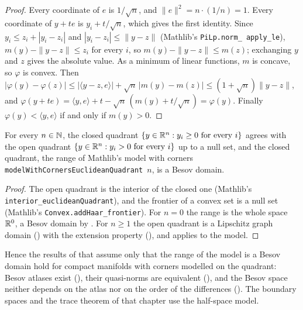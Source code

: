 \begin{proof}
\leanok
Every coordinate of $e$ is $1/\sqrt{n}$, and $\|e\|^2 = n \cdot (1/n) = 1$. Every coordinate of
$y + te$ is $y_i + t/\sqrt{n}$, which gives the first identity. Since $y_i \leq z_i + |y_i - z_i|$
and $|y_i - z_i| \leq \|y - z\|$ (Mathlib's \texttt{PiLp.\allowbreak norm\_\allowbreak
apply\_\allowbreak le}), $m(y) - \|y - z\| \leq z_i$ for every $i$, so $m(y) - \|y - z\| \leq
m(z)$; exchanging $y$ and $z$ gives the absolute value. As a minimum of linear functions, $m$ is
concave, so $\varphi$ is convex. Then
$|\varphi(y) - \varphi(z)| \leq |\langle y - z, e \rangle| + \sqrt{n}\, |m(y) - m(z)| \leq
(1 + \sqrt{n}) \|y - z\|$, and $\varphi(y + te) = \langle y, e \rangle + t - \sqrt{n}\,(m(y) +
t/\sqrt{n}) = \varphi(y)$. Finally $\varphi(y) < \langle y, e \rangle$ if and only if $m(y) > 0$.
\end{proof}

\begin{theorem}
\label{thm:quadrant-besov-domain}
\leanok
{}
For every $n \in \mathbb{N}$, the closed quadrant $\{y \in \mathbb{R}^n : y_i \geq 0 \text{ for every } i\}$
agrees with the open quadrant $\{y \in \mathbb{R}^n : y_i > 0 \text{ for every } i\}$ up to a null set,
and the closed quadrant, the range of Mathlib's model with corners
\texttt{modelWithCornersEuclideanQuadrant}~$n$, is a Besov domain.
\end{theorem}

\begin{proof}
\leanok
The open quadrant is the interior of the closed one (Mathlib's
\texttt{interior\_\allowbreak euclideanQuadrant}), and the frontier of a convex set is a null set
(Mathlib's \texttt{Convex.\allowbreak addHaar\_\allowbreak frontier}). For $n = 0$ the range is the
whole space $\mathbb{R}^0$, a Besov domain by . For $n \geq 1$ the open quadrant is a
Lipschitz graph domain () with the extension property
(), and  applies to the model.
\end{proof}

Hence the results of  that assume only that the range of the model is a Besov
domain hold for compact manifolds with corners modelled on the quadrant: Besov atlases exist
(), their quasi-norms are equivalent (), and the
Besov space neither depends on the atlas nor on the order of the differences
(). The boundary spaces and the trace theorem of that chapter use the
half-space model.

